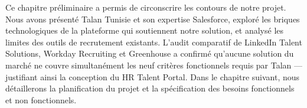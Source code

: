 Ce chapitre préliminaire a permis de circonscrire les contours de notre projet. Nous avons présenté Talan Tunisie et son expertise Salesforce, exploré les briques technologiques de la plateforme qui soutiennent notre solution, et analysé les limites des outils de recrutement existants. L'audit comparatif de LinkedIn Talent Solutions, Workday Recruiting et Greenhouse a confirmé qu'aucune solution du marché ne couvre simultanément les neuf critères fonctionnels requis par Talan --- justifiant ainsi la conception du HR Talent Portal. Dans le chapitre suivant, nous détaillerons la planification du projet et la spécification des besoins fonctionnels et non fonctionnels.
